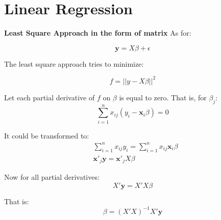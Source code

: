 \documentclass{article}
\begin{document}
\section{Linear Regression}
\textbf{Least Square Approach in the form of matrix}
As for:

\begin{equation}
\mathbf{y}=X\beta + \epsilon
\end{equation}

The least square approach tries to minimize:

\begin{equation}
f=||y-X\beta||^2
\end{equation}

Let each partial derivative of \(f\) on \(\beta\) is equal to zero. That is,
for \(\beta_j\):
\begin{equation}
\sum_{i=1}^nx_{ij}(y_i-\mathbf{x}_i\beta)=0
\end{equation}

It could be transformed to:
\begin{equation}
\begin{split}
&\sum_{i=1}^nx_{ij}y_i=\sum_{i=1}^nx_{ij}\mathbf{x}_i\beta\\
&\mathbf{x}'_j\mathbf{y}=\mathbf{x}'_jX\beta
\end{split}
\end{equation}

Now for all partial derivatives:
\begin{equation}
X'\mathbf{y}=X'X\beta
\end{equation}

That is:
\begin{equation}
\beta=(X'X)^{-1}X'\mathbf{y}
\end{equation}
\end{document}

